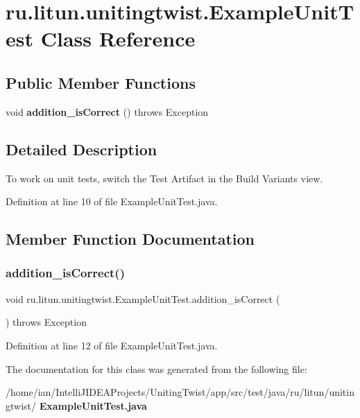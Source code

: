 \section{ru.\+litun.\+unitingtwist.\+Example\+Unit\+Test Class Reference}
\label{classru_1_1litun_1_1unitingtwist_1_1_example_unit_test}
\subsection*{Public Member Functions}
\begin{DoxyCompactItemize}
\item 
void \textbf{ addition\+\_\+is\+Correct} ()  throws Exception 
\end{DoxyCompactItemize}


\subsection{Detailed Description}
To work on unit tests, switch the Test Artifact in the Build Variants view. 

Definition at line 10 of file Example\+Unit\+Test.\+java.



\subsection{Member Function Documentation}
\mbox{\label{classru_1_1litun_1_1unitingtwist_1_1_example_unit_test_a847dae68267f2b5e01455337bfa28fbc}} 
\subsubsection{addition\+\_\+is\+Correct()}
{\footnotesize\ttfamily void ru.\+litun.\+unitingtwist.\+Example\+Unit\+Test.\+addition\+\_\+is\+Correct (\begin{DoxyParamCaption}{ }\end{DoxyParamCaption}) throws Exception}



Definition at line 12 of file Example\+Unit\+Test.\+java.



The documentation for this class was generated from the following file\+:\begin{DoxyCompactItemize}
\item 
/home/ian/\+Intelli\+J\+I\+D\+E\+A\+Projects/\+Uniting\+Twist/app/src/test/java/ru/litun/unitingtwist/\textbf{ Example\+Unit\+Test.\+java}\end{DoxyCompactItemize}
